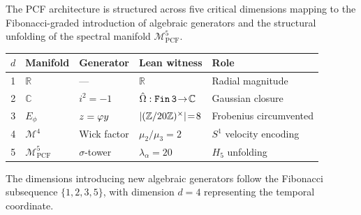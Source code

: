 \begin{Corollary}\label{cor:critical-dims}
The PCF architecture is structured across five critical dimensions mapping to the Fibonacci-graded introduction of algebraic generators and the structural unfolding of the spectral manifold $\mathcal{M}^5_{\mathrm{PCF}}$.

\begin{center}
\footnotesize
\begin{tabular}{@{}cllll@{}}
\toprule
$d$ & Manifold & Generator & Lean witness & Role \\
\midrule
1 & $\mathbb{R}$ & --- & $\mathbb{R}$ & Radial magnitude \\
2 & $\mathbb{C}$ & $i^2=-1$ & $\hat\Omega:\texttt{Fin\,3}\!\to\!\mathbb{C}$ & Gaussian closure \\
3 & $E_{\phi}$ & $z = \varphi y$ & $|(\mathbb{Z}/20\mathbb{Z})^\times|\!=\!8$ & Frobenius circumvented \\
4 & $\mathcal{M}^4$ & Wick factor & $\mu_2/\mu_3 = 2$ & $S^1$ velocity encoding \\
5 & $\mathcal{M}^5_{\mathrm{PCF}}$ & $\sigma$-tower & $\lambda_{\alpha}=20$ & $H_5$ unfolding \\
\bottomrule
\end{tabular}
\end{center}
The dimensions introducing new algebraic generators follow the Fibonacci subsequence $\{1,2,3,5\}$, with dimension $d=4$ representing the temporal coordinate.
\end{Corollary}


